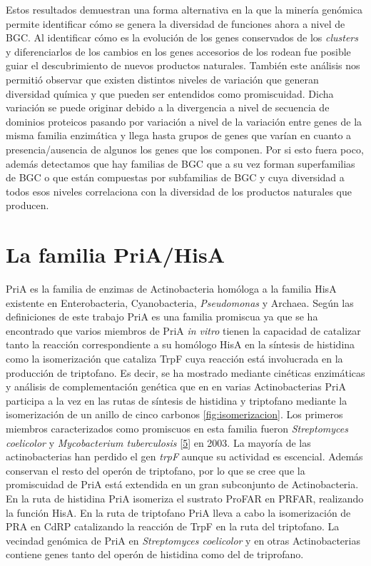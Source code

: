 \documentclass[12pt,twoside]{reedthesis}
\begin{document}
  Estos resultados demuestran una forma alternativa en la que la minería
  genómica permite identificar cómo se genera la diversidad de funciones
  ahora a nivel de BGC. Al identificar cómo es la evolución de los genes
  conservados de los \emph{clusters} y diferenciarlos de los cambios en
  los genes accesorios de los rodean fue posible guiar el descubrimiento
  de nuevos productos naturales. También este análisis nos permitió
  observar que existen distintos niveles de variación que generan
  diversidad química y que pueden ser entendidos como promiscuidad. Dicha
  variación se puede originar debido a la divergencia a nivel de secuencia
  de dominios proteicos pasando por variación a nivel de la variación
  entre genes de la misma familia enzimática y llega hasta grupos de genes
  que varían en cuanto a presencia/ausencia de algunos los genes que los
  componen. Por si esto fuera poco, además detectamos que hay familias de
  BGC que a su vez forman superfamilias de BGC o que están compuestas por
  subfamilias de BGC y cuya diversidad a todos esos niveles correlaciona
  con la diversidad de los productos naturales que producen.
  
  \chapter{La familia PriA/HisA}\label{la-familia-priahisa}
  
  PriA es la familia de enzimas de Actinobacteria homóloga a la familia
  HisA existente en Enterobacteria, Cyanobacteria, \emph{Pseudomonas} y
  Archaea. Según las definiciones de este trabajo PriA es una familia
  promiscua ya que se ha encontrado que varios miembros de PriA \emph{in
  vitro} tienen la capacidad de catalizar tanto la reacción
  correspondiente a su homólogo HisA en la síntesis de histidina como la
  isomerización que cataliza TrpF cuya reacción está involucrada en la
  producción de triptofano. Es decir, se ha mostrado mediante cinéticas
  enzimáticas y análisis de complementación genética que en en varias
  Actinobacterias PriA participa a la vez en las rutas de síntesis de
  histidina y triptofano mediante la isomerización de un anillo de cinco
  carbonos \autoref{fig:isomerizacion}. Los primeros miembros
  caracterizados como promiscuos en esta familia fueron \emph{Streptomyces
  coelicolor} y \emph{Mycobacterium tuberculosis}
  {[}\protect\hyperlink{ref-baronagomez_occurrence_2003}{5}{]} en 2003. La
  mayoría de las actinobacterias han perdido el gen \emph{trpF} aunque su
  actividad es escencial. Además conservan el resto del operón de
  triptofano, por lo que se cree que la promiscuidad de PriA está
  extendida en un gran subconjunto de Actinobacteria. En la ruta de
  histidina PriA isomeriza el sustrato ProFAR en PRFAR, realizando la
  función HisA. En la ruta de triptofano PriA lleva a cabo la
  isomerización de PRA en CdRP catalizando la reacción de TrpF en la ruta
  del triptofano. La vecindad genómica de PriA en \emph{Streptomyces
  coelicolor} y en otras Actinobacterias contiene genes tanto del operón
  de histidina como del de triprofano.
  
\end{document}
